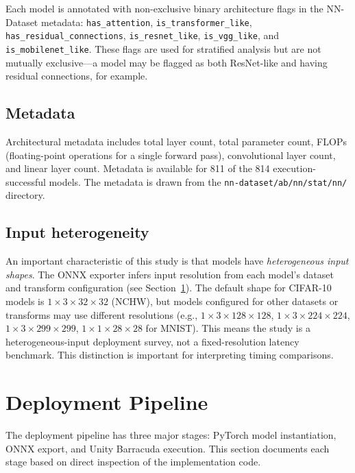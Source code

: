 \documentclass[10pt,twocolumn,letterpaper]{article}
\begin{document}
Each model is annotated with non-exclusive binary architecture flags in the NN-Dataset metadata: \texttt{has\_attention}, \texttt{is\_transformer\_like}, \texttt{has\_residual\_connections}, \texttt{is\_resnet\_like}, \texttt{is\_vgg\_like}, and \texttt{is\_mobilenet\_like}. These flags are used for stratified analysis but are not mutually exclusive---a model may be flagged as both ResNet-like and having residual connections, for example.

\subsection{Metadata}

Architectural metadata includes total layer count, total parameter count, FLOPs (floating-point operations for a single forward pass), convolutional layer count, and linear layer count. Metadata is available for 811 of the 814 execution-successful models. The metadata is drawn from the \texttt{nn-dataset/ab/nn/stat/nn/} directory.

\subsection{Input heterogeneity}

An important characteristic of this study is that models have \emph{heterogeneous input shapes}. The ONNX exporter infers input resolution from each model's dataset and transform configuration (see Section~\ref{sec:pipeline}). The default shape for CIFAR-10 models is $1\times3\times32\times32$ (NCHW), but models configured for other datasets or transforms may use different resolutions (e.g., $1\times3\times128\times128$, $1\times3\times224\times224$, $1\times3\times299\times299$, $1\times1\times28\times28$ for MNIST). This means the study is a heterogeneous-input deployment survey, not a fixed-resolution latency benchmark. This distinction is important for interpreting timing comparisons.

\section{Deployment Pipeline}\label{sec:pipeline}

The deployment pipeline has three major stages: PyTorch model instantiation, ONNX export, and Unity Barracuda execution. This section documents each stage based on direct inspection of the implementation code.
\end{document}
